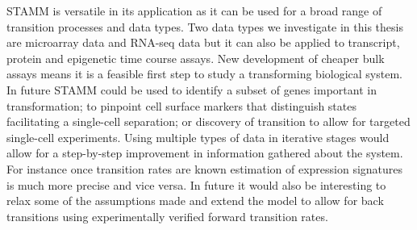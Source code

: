 
STAMM is versatile in its application as it can be used for a broad range of transition processes and data types. Two data types we investigate in this thesis are microarray data and RNA-seq data but it can also be applied to transcript, protein and epigenetic time course assays. New development of cheaper bulk assays means it is a feasible first step to study a transforming biological system. In future STAMM could be used to identify a subset of genes important in transformation; to pinpoint cell surface markers that distinguish states facilitating a single-cell separation; or discovery of transition to allow for targeted single-cell experiments. Using multiple types of data in iterative stages would allow for a step-by-step improvement in information gathered about the system. For instance once transition rates are known estimation of expression signatures is much more precise and vice versa. In future it would also be interesting to relax some of the assumptions made and extend the model to allow for back transitions using experimentally verified forward transition rates.


